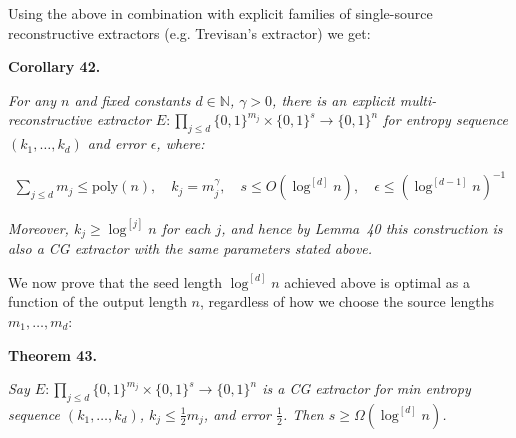\documentclass[10pt,a4paper]{article}
\begin{document}
Using the above in combination with explicit families of single-source reconstructive extractors (e.g. Trevisan’s extractor) we get:\par





\par\medskip\noindent\textbf{
\textbf{Corollary 42}\textbf{.}
}\par



\emph{For any $n$ and fixed constants $d\in\mathbb{N}$, $\gamma>0$, there is an explicit multi-reconstructive extractor $E:\prod_{j\leq d}\{0,1\}^{m_{j}}\times\{0,1\}^{s}\to\{0,1\}^{n}$ for entropy sequence $(k_{1},\ldots,k_{d})$ and error $\epsilon$, where:}\par


\[\begin{gathered}
\sum_{j\leq d}m_{j}\leq\mathrm{poly}(n),\quad k_{j}=m_{j}^{\gamma},\quad s\leq
O(\log^{[d]}n),\quad\epsilon\leq(\log^{[d-1]}n)^{-1}
\end{gathered}\]


\emph{Moreover, $k_{j}\geq\log^{[j]}n$ for each $j$, and hence by Lemma 40 this construction is also a CG extractor with the same parameters stated above.}\par






We now prove that the seed length $\log^{[d]}n$ achieved above is optimal as a function of the output length $n$, regardless of how we choose the source lengths $m_{1},\ldots,m_{d}$:\par





\par\medskip\noindent\textbf{
\textbf{Theorem 43}\textbf{.}
}\par



\emph{Say $E:\prod_{j\leq d}\{0,1\}^{m_{j}}\times\{0,1\}^{s}\to\{0,1\}^{n}$ is a CG extractor for min entropy sequence $(k_{1},\ldots,k_{d})$, $k_{j}\leq\frac{1}{2}m_{j}$, and error $\frac{1}{2}$. Then $s\geq\Omega(\log^{[d]}n)$.}\par



\end{document}
